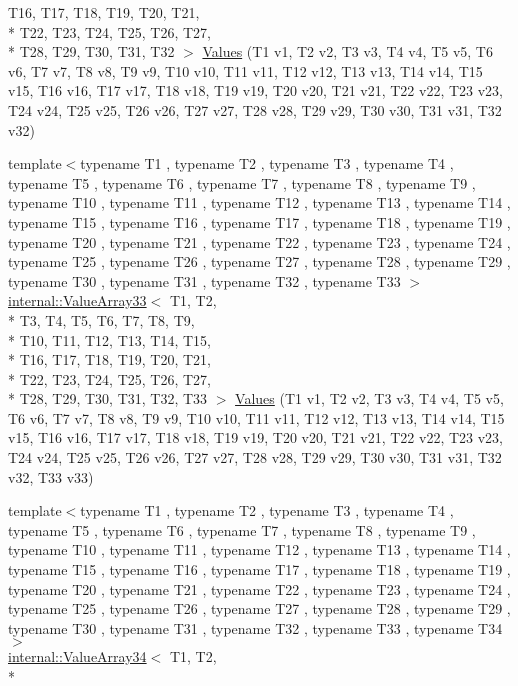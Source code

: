 \begin{DoxyCompactItemize}
T16, T17, T18, T19, T20, T21, \\*
T22, T23, T24, T25, T26, T27, \\*
T28, T29, T30, T31, T32 $>$ \hyperlink{namespacetesting_afeff614d4c808c753bbfa208409ad664}{Values} (T1 v1, T2 v2, T3 v3, T4 v4, T5 v5, T6 v6, T7 v7, T8 v8, T9 v9, T10 v10, T11 v11, T12 v12, T13 v13, T14 v14, T15 v15, T16 v16, T17 v17, T18 v18, T19 v19, T20 v20, T21 v21, T22 v22, T23 v23, T24 v24, T25 v25, T26 v26, T27 v27, T28 v28, T29 v29, T30 v30, T31 v31, T32 v32)
\item 
{\footnotesize template$<$typename T1 , typename T2 , typename T3 , typename T4 , typename T5 , typename T6 , typename T7 , typename T8 , typename T9 , typename T10 , typename T11 , typename T12 , typename T13 , typename T14 , typename T15 , typename T16 , typename T17 , typename T18 , typename T19 , typename T20 , typename T21 , typename T22 , typename T23 , typename T24 , typename T25 , typename T26 , typename T27 , typename T28 , typename T29 , typename T30 , typename T31 , typename T32 , typename T33 $>$ }\\\hyperlink{classtesting_1_1internal_1_1_value_array33}{internal\-::\-Value\-Array33}$<$ T1, T2, \\*
T3, T4, T5, T6, T7, T8, T9, \\*
T10, T11, T12, T13, T14, T15, \\*
T16, T17, T18, T19, T20, T21, \\*
T22, T23, T24, T25, T26, T27, \\*
T28, T29, T30, T31, T32, T33 $>$ \hyperlink{namespacetesting_ac972228f2ff86974ab6591a10512326a}{Values} (T1 v1, T2 v2, T3 v3, T4 v4, T5 v5, T6 v6, T7 v7, T8 v8, T9 v9, T10 v10, T11 v11, T12 v12, T13 v13, T14 v14, T15 v15, T16 v16, T17 v17, T18 v18, T19 v19, T20 v20, T21 v21, T22 v22, T23 v23, T24 v24, T25 v25, T26 v26, T27 v27, T28 v28, T29 v29, T30 v30, T31 v31, T32 v32, T33 v33)
\item 
{\footnotesize template$<$typename T1 , typename T2 , typename T3 , typename T4 , typename T5 , typename T6 , typename T7 , typename T8 , typename T9 , typename T10 , typename T11 , typename T12 , typename T13 , typename T14 , typename T15 , typename T16 , typename T17 , typename T18 , typename T19 , typename T20 , typename T21 , typename T22 , typename T23 , typename T24 , typename T25 , typename T26 , typename T27 , typename T28 , typename T29 , typename T30 , typename T31 , typename T32 , typename T33 , typename T34 $>$ }\\\hyperlink{classtesting_1_1internal_1_1_value_array34}{internal\-::\-Value\-Array34}$<$ T1, T2, \\*

\end{DoxyCompactItemize}
